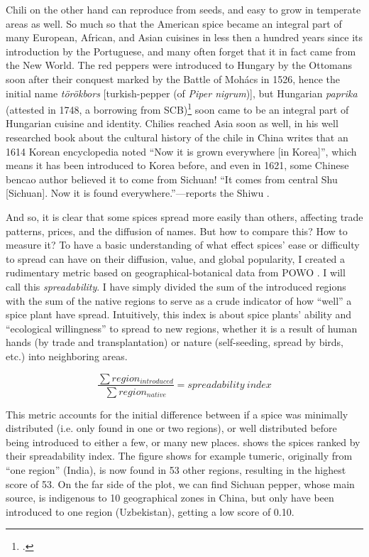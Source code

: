Chili on the other hand can reproduce from seeds, and easy to grow in temperate areas as well. So much so that the American spice became an integral part of many European, African, and Asian cuisines in less then a hundred years since its introduction by the Portuguese, and many often forget that it in fact came from the New World. The red peppers were introduced to Hungary by the Ottomans soon after their conquest marked by the Battle of Mohács in 1526, hence the initial name \textit{törökbors} [turkish-pepper (of \textit{Piper nigrum})], but Hungarian \textit{paprika} (attested in 1748, a borrowing from \gls{SCB})\footcite[paprika]{zaicz_etimologiai_2006} soon came to be an integral part of Hungarian cuisine and identity. Chilies reached Asia soon as well, \textcite{dott_chile_2020} in his well researched book about the cultural history of the chile in China writes that an 1614 Korean encyclopedia noted ``Now it is grown everywhere [in Korea]'', which means it has been introduced to Korea before, and even in 1621, some Chinese \gls{bencao} author believed it to come from Sichuan! ``It comes from central Shu [Sichuan]. Now it is found everywhere.''---reports the \gls{Shiwu} \autocite[24,28]{dott_chile_2020}.

And so, it is clear that some spices spread more easily than others, affecting trade patterns, prices, and the diffusion of names. But how to compare this? How to measure it? To have a basic understanding of what effect spices' ease or difficulty to spread can have on their diffusion, value, and global popularity, I created a rudimentary metric based on geographical-botanical data from \gls{POWO} \autocite{powo}. I will call this \textit{spreadability}. I have simply divided the sum of the introduced regions with the sum of the native regions to serve as a crude indicator of how ``well'' a spice plant have spread. Intuitively, this index is about spice plants' ability and ``ecological willingness'' to spread to new regions, whether it is a result of human hands (by trade and transplantation) or nature (self-seeding, spread by birds, etc.) into neighboring areas. 

\[ \frac{\sum region_{introduced}}{\sum region_{native}} = spreadability~index \]

\noindent This metric accounts for the initial difference between if a spice was minimally distributed (i.e. only found in one or two regions), or well distributed before being introduced to either a few, or many new places.  shows the spices ranked by their spreadability index. The figure shows for example tumeric, originally from ``one region'' (India), is now found in 53 other regions, resulting in the highest score of 53. On the far side of the plot, we can find Sichuan pepper, whose main source,  is indigenous to 10 geographical zones in China, but only have been introduced to one region (Uzbekistan), getting a low score of 0.10.



